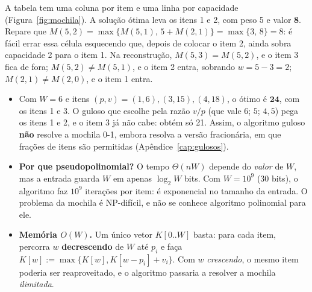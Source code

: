 \begin{exemplo}[$W=5$ e itens $(p,v)=(2,3),(3,5),(1,1)$]\label{ex:mochila}
A tabela tem uma coluna por item e uma linha por capacidade (Figura~\ref{fig:mochila}). A solução ótima leva os itens 1 e 2, com peso 5 e valor \textbf{8}. Repare que $M(5,2)=\max\{M(5,1),\,5+M(2,1)\}=\max\{3,\,8\}=8$: é fácil errar essa célula esquecendo que, depois de colocar o item 2, ainda sobra capacidade 2 para o item 1. Na reconstrução, $M(5,3)=M(5,2)$, e o item 3 fica de fora; $M(5,2)\ne M(5,1)$, e o item 2 entra, sobrando $w=5-3=2$; $M(2,1)\ne M(2,0)$, e o item 1 entra.
\begin{figura}[A tabela da mochila do Exemplo~\ref{ex:mochila}. A célula $M(5,2)$ escolhe o maior entre ``deixar o item 2 de fora'' (seta da esquerda, valor 3) e ``levar o item 2'' (seta diagonal, $5+M(2,1)=8$). Em verde, o caminho da reconstrução.\label{fig:mochila}]
\end{figura}
\end{exemplo}
\begin{itemize}
  \item Com $W=6$ e itens $(p,v)=(1,6),(3,15),(4,18)$, o ótimo é $\mathbf{24}$, com os itens 1 e 3. O guloso que escolhe pela razão $v/p$ (que vale $6$; $5$; $4{,}5$) pega os itens 1 e 2, e o item 3 já não cabe: obtém só 21. Assim, o algoritmo guloso \textbf{não} resolve a mochila 0-1, embora resolva a versão fracionária, em que frações de itens são permitidas (Apêndice~\ref{cap:gulosos}).
  \item \textbf{Por que pseudopolinomial?} O tempo $\Theta(nW)$ depende do \emph{valor} de $W$, mas a entrada guarda $W$ em apenas $\log_2W$ bits. Com $W=10^9$ (30 bits), o algoritmo faz $10^9$ iterações por item: é exponencial no tamanho da entrada. O problema da mochila é NP-difícil, e não se conhece algoritmo polinomial para ele.
  \item \textbf{Memória $O(W)$.} Um único vetor $K[0..W]$ basta: para cada item, percorra $w$ \textbf{decrescendo} de $W$ até $p_i$ e faça $K[w]:=\max\{K[w],K[w-p_i]+v_i\}$. Com $w$ \emph{crescendo}, o mesmo item poderia ser reaproveitado, e o algoritmo passaria a resolver a mochila \emph{ilimitada}.
\end{itemize}

